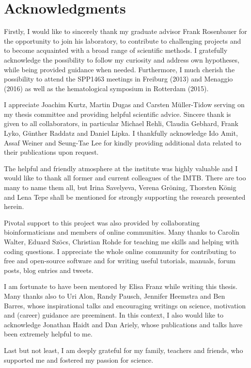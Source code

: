 \chapter*{Acknowledgments}
	Firstly, I  would like to sincerely thank my graduate advisor Frank Rosenbauer for the opportunity to join his laboratory, to contribute to challenging projects and to become acquainted with a broad range of scientific methods. I gratefully acknowledge the possibility to follow my curiosity and address own hypotheses, while being provided guidance when needed.  Furthermore, I much cherish the possibility to attend the SPP1463 meetings in Freiburg (2013) and Menaggio (2016) as well as the hematological symposium in Rotterdam (2015).
	
	I appreciate Joachim Kurtz, Martin Dugas and Carsten Müller-Tidow serving on my thesis committee and providing helpful scientific advice. Sincere thank is given to all collaborators, in particular Michael Rehli, Claudia Gebhard, Frank Lyko, Günther Raddatz and Daniel Lipka. I thankfully acknowledge Ido Amit, Assaf Weiner and Seung-Tae Lee for kindly providing additional data related to their publications upon request.  
	
	The helpful and friendly atmosphere at the institute was highly valuable and I would like to thank all former and current colleagues of the IMTB. There are too many to name them all, but Irina Savelyeva, Verena Gröning, Thorsten König and  Lena Tepe shall be mentioned for strongly supporting the research presented herein.
	
	Pivotal support to this project was also provided by collaborating bioinformaticians and members of online communities. Many thanks to Carolin Walter, Eduard Szöcs, Christian Rohde for teaching me skills and helping with coding questions. I appreciate the whole online community for contributing to free and open-source software and for writing useful tutorials, manuals, forum posts, blog entries and tweets.   
	
	I am fortunate to have been mentored by Elisa Franz while writing this thesis. Many thanks also to Uri Alon, Randy Pausch, Jennifer Heemstra and Ben Barres, whose inspirational talks and encouraging writings on science, motivation and (career) guidance are preeminent. In this context, I also would like to acknowledge Jonathan Haidt and Dan Ariely, whose publications and talks have been extremely helpful to me.  
	
   Last but not least, I am deeply grateful for my family, teachers and friends, who supported me and fostered my passion for science. 


